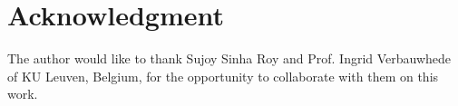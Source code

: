 \documentclass[conference]{IEEEtran}
\begin{document}



\section*{Acknowledgment}


The author would like to thank Sujoy Sinha Roy and Prof. Ingrid Verbauwhede of KU Leuven, Belgium, for the opportunity to collaborate with them on this work.



\end{document}
